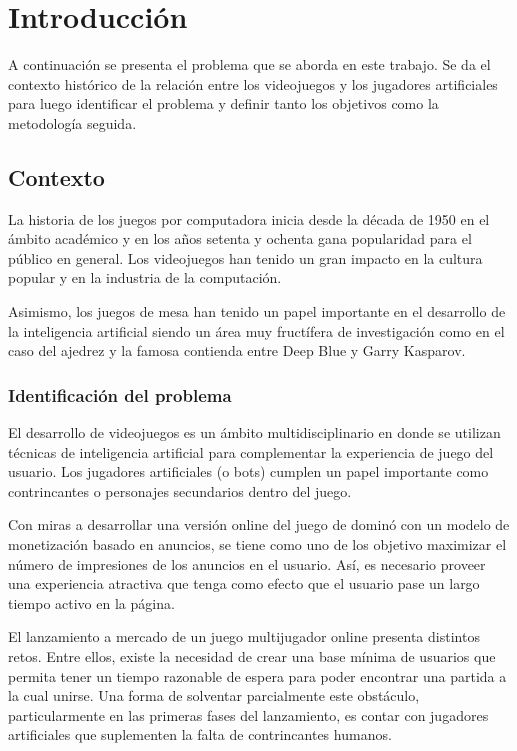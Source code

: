 \chapter*{Introducción}


\noindent

A continuación se presenta el problema que se aborda en este trabajo. Se da
el contexto histórico de la relación entre los videojuegos y los jugadores
artificiales para luego identificar el problema y definir tanto los objetivos
como la metodología seguida.

\section{Contexto}

La historia de los juegos por computadora inicia desde la década de 1950 en el
ámbito académico y en los años setenta y ochenta gana popularidad para el
público en general. Los videojuegos han tenido un gran impacto en la cultura
popular y en la industria de la computación.

Asimismo, los juegos de mesa han tenido un papel importante en el desarrollo de
la inteligencia artificial siendo un área muy fructífera de investigación como
en el caso del ajedrez y la famosa contienda entre Deep Blue y Garry Kasparov.

\subsection{Identificación del problema}

El desarrollo de videojuegos es un ámbito multidisciplinario en donde se
utilizan técnicas de inteligencia artificial para complementar la experiencia de
juego del usuario. Los jugadores artificiales (o bots) cumplen un papel
importante como contrincantes o personajes secundarios dentro del juego.

Con miras a desarrollar una versión online del juego de dominó con un modelo de
monetización basado en anuncios, se tiene como uno de los objetivo maximizar el
número de impresiones de los anuncios en el usuario. Así, es necesario proveer
una experiencia atractiva que tenga como efecto que el usuario pase un largo
tiempo activo en la página.

El lanzamiento a mercado de un juego multijugador online presenta distintos
retos. Entre ellos, existe la necesidad de crear una base mínima de usuarios que
permita tener un tiempo razonable de espera para poder encontrar una partida a
la cual unirse. Una forma de solventar parcialmente este obstáculo,
particularmente en las primeras fases del lanzamiento, es contar con jugadores
artificiales que suplementen la falta de contrincantes humanos.

